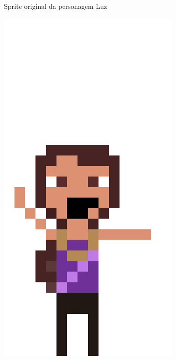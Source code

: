 \begin{figure}[htbp]
\begin{subfigure}{0.32\linewidth}
        \caption{\small Sprite original da personagem Luz}
        \label{fig:sketchIrma1}
    \end{subfigure}
    \begin{subfigure}{0.32\linewidth}
        \includegraphics[width=1\linewidth]{figs/sprites/irma_bracos_abertos.png}

\end{subfigure}
\end{figure}

